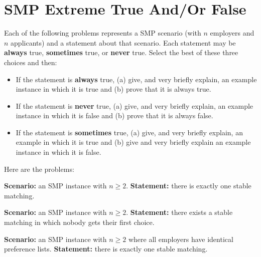 \section{SMP Extreme True And/Or False}

Each of the following problems represents a SMP scenario (with $n$ employers and $n$ applicants) and a statement about that scenario. Each statement may be \textbf{always} true, \textbf{sometimes} true, or \textbf{never} true. Select the best of these three choices and then:
\begin{itemize}
	\item If the statement is \textbf{always} true, (a) give, and very briefly explain, an example instance in which it is true and (b) prove that it is always true.
	\item If the statement is \textbf{never} true, (a) give, and very briefly explain, an example instance in which it is false and (b) prove that it is always false.
	\item If the statement is \textbf{sometimes} true, (a) give, and very briefly explain, an example in which it is true and (b) give and very briefly explain an example instance in which it is false.
\end{itemize}
Here are the problems:

\begin{questions}
	\question[3] \textbf{Scenario:} an SMP instance with $n \ge 2$. \textbf{Statement:} there is exactly one stable matching.
	\ifsolutions\fi

	\question[4] \textbf{Scenario:} an SMP instance with $n \ge 2$. \textbf{Statement:} there exists a stable matching in which nobody gets their first choice.
	\ifsolutions\fi

	\question[4] \textbf{Scenario:} an SMP instance with $n \ge 2$ where all employers have identical preference lists. \textbf{Statement:} there is exactly one stable matching.
	\ifsolutions\fi

\end{questions}
